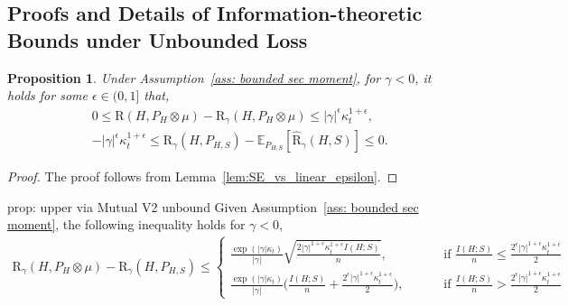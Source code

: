 \documentclass{article}
\theoremstyle{plain}
\theoremstyle{plain}
\newtheorem{proposition}[theorem]{Proposition}
\theoremstyle{definition}
\theoremstyle{remark}
\newcommand{\RTERM}{\widehat{\mathrm{R}}_{\gamma}}
\newcommand{\RTrue}{\mathrm{R}}
\newcommand{\RTET}{\mathrm{R}_{\gamma}}
\newcommand{\mbE}{\mathbb{E}}
\begin{document}
 \subsection{Proofs and Details of Information-theoretic Bounds under Unbounded Loss }\label{app: IT unbounded}
 \begin{proposition}\label{Prop:True_TT_unbounded_TIT}
    Under Assumption~\ref{ass: bounded sec moment}, for $\gamma<0$, it holds for some $\epsilon\in(0,1]$ that,
   \begin{equation}
    \begin{split}
        &0\leq   \RTrue(H, P_{H}\otimes \mu)- \RTET(H,P_{H}\otimes \mu)\leq |\gamma|^{\epsilon} \kappa_t^{1+\epsilon},\\
        &-|\gamma|^{\epsilon}\kappa_t^{1+\epsilon}\leq \RTET(H,P_{H,S}) -\mbE_{P_{H,S}}[\RTERM(H,S)]\leq 0.
    \end{split}
    \end{equation}
\end{proposition}
\begin{proof}
    The proof follows from Lemma~\ref{lem:SE_vs_linear_epsilon}.
\end{proof}
\begin{tcolorbox}
    \begin{repproposition}{prop: upper via Mutual V2 unbound}
Given Assumption~\ref{ass: bounded sec moment}, the following inequality holds for $\gamma<0$,
\begin{equation}
    \begin{split}
          \RTET(H,P_{H}\otimes \mu)-\RTET(H,P_{H,S})\leq  \begin{cases}
            \frac{\exp(|\gamma| \kappa_t)}{|\gamma|} \sqrt{\frac{2|\gamma|^{1+\epsilon} \kappa_t^{1+\epsilon} I(H;S)}{n}},\qquad &\mbox{ if }\frac{I(H;S)}{n}\leq \frac{2^{\epsilon}|\gamma|^{1+\epsilon} \kappa_t^{1+\epsilon}}{2}\\
              \frac{\exp(|\gamma| \kappa_t)}{ |\gamma|}\Big( \frac{ I(H;S)}{n}+\frac{2^{\epsilon}|\gamma|^{1+\epsilon} \kappa_t^{1+\epsilon}}{2}\Big),\qquad & \mbox{ if } \frac{I(H;S)}{n}>\frac{2^{\epsilon}|\gamma|^{1+\epsilon} \kappa_t^{1+\epsilon}}{2}
          \end{cases}
    \end{split} \nonumber 
\end{equation}
\end{repproposition}
\end{tcolorbox}
\end{document}
